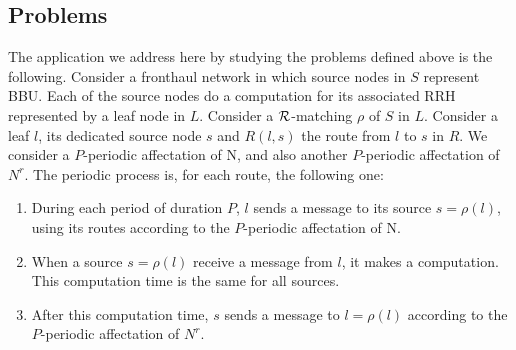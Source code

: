 \documentclass[a4paper,10pt]{article}
\begin{document}
   
  
  \subsection{Problems}
	
    The application we address here by studying the problems defined above is the following. Consider a fronthaul network in which source nodes in $S$ represent BBU.
    Each of the source nodes do a computation for its associated RRH represented by a leaf node in $L$. Consider a ${\cal R}$-matching $\rho$ of $S$ in $L$. Consider a leaf $l$, its dedicated source node $s$
    and $R(l,s)$ the route from $l$ to $s$ in $R$. We consider a $P$-periodic affectation of N, and also another $P$-periodic affectation of $N^{r}$.
    The periodic process is, for each route, the following one:
    \begin{enumerate}
    \item During each period of duration $P$, $l$ sends a message to its source $s=\rho(l)$, using its routes according to the $P$-periodic affectation of N. 
    \item When a source $s=\rho(l)$ receive a message from $l$, it makes a computation. This computation time is the same for all sources.
    \item After this computation time, $s$ sends a message to $l=\rho(l)$ according to the $P$-periodic affectation of $N^{r}$.
    \end{enumerate}
\end{document}
